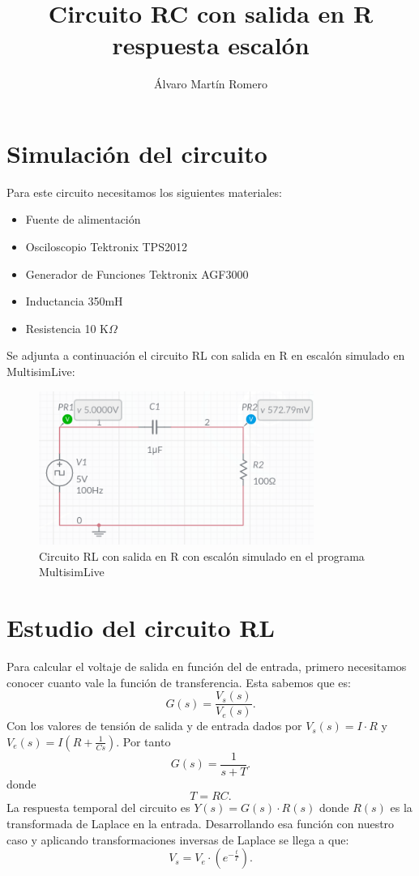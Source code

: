 \documentclass[11pt,letterpaper]{article}
\title{Circuito RC con salida en R respuesta escalón}
\author{Álvaro Martín Romero}
\begin{document}
\maketitle	
\section{Simulación del circuito}%
\label{sec:Simulación del circuito}
Para este circuito necesitamos los siguientes materiales:
\begin{itemize}
	\item Fuente de alimentación
	\item Osciloscopio Tektronix TPS2012
	\item Generador de Funciones Tektronix AGF3000
	\item Inductancia 350mH
	\item Resistencia 10 K$\Omega$
\end{itemize}
Se adjunta a continuación el circuito RL con salida en R en escalón simulado en MultisimLive:
\begin{figure}[H]
	\centering
	\includegraphics[width=0.8\textwidth]{imagen/circuitoRL_Rescalon.png}
	\caption{Circuito RL con salida en R con escalón simulado en el programa MultisimLive}
	\label{fig:imagen-circuitoRL}
\end{figure}
\section{Estudio del circuito RL}%
\label{sec:Estudio del circuito RL}
Para calcular el voltaje de salida en función del de entrada, primero necesitamos conocer cuanto vale la función de transferencia. Esta sabemos que es:
\[
	G\left( s \right) =\frac{V_s(s)}{V_e(s)}
.\] 
Con los valores de tensión de salida y de entrada dados por $V_s\left( s \right) =I\cdot R$ y $V_e\left( s \right) =I\left( R+\frac{1}{Cs} \right) $. Por tanto
\[
	G\left( s \right) =\frac{1}{s+T} 
.\] 
donde \[
T=RC
.\] 
La respuesta temporal del circuito es $Y(s)=G(s)\cdot R(s)$ donde $R(s)$ es la transformada de Laplace en la entrada. Desarrollando esa función con nuestro caso y aplicando transformaciones inversas de Laplace se llega a que:
\[
	V_{s}=V_e\cdot \left(e^{-\frac{t}{T}} \right) 
.\] 
\end{document}
